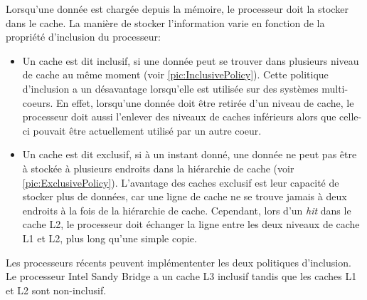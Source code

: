         Lorsqu'une donnée est chargée depuis la mémoire, le processeur doit la stocker dans le cache. La manière de stocker l'information  varie en fonction de la propriété d'inclusion du processeur:
        \begin{itemize}
            \item Un cache est dit inclusif, si une donnée peut se trouver dans plusieurs niveau de cache au même moment (voir \autoref{pic:InclusivePolicy}). Cette politique d'inclusion a un désavantage lorsqu'elle est utilisée sur des systèmes multi-coeurs. En effet, lorsqu'une donnée doit être retirée d'un niveau de cache, le processeur doit aussi l'enlever des niveaux de caches inférieurs alors que celle-ci pouvait être actuellement utilisé par un autre coeur.
        
            \item Un cache est dit exclusif, si à un instant donné, une donnée ne peut pas être à stockée à plusieurs endroits dans la hiérarchie de cache (voir \autoref{pic:ExclusivePolicy}). L'avantage des caches exclusif est leur capacité de stocker plus de données, car une ligne de cache ne se trouve jamais à deux endroits à la fois de la hiérarchie de cache. Cependant, lors d'un \textit{hit} dans le cache L2, le processeur doit échanger la ligne entre les deux niveaux de cache L1 et L2, plus long qu'une simple copie.
        \end{itemize}
        Les processeurs récents peuvent implémententer les deux politiques d'inclusion. Le processeur Intel Sandy Bridge a un cache L3 inclusif tandis que les caches L1 et L2 sont non-inclusif. 
        
